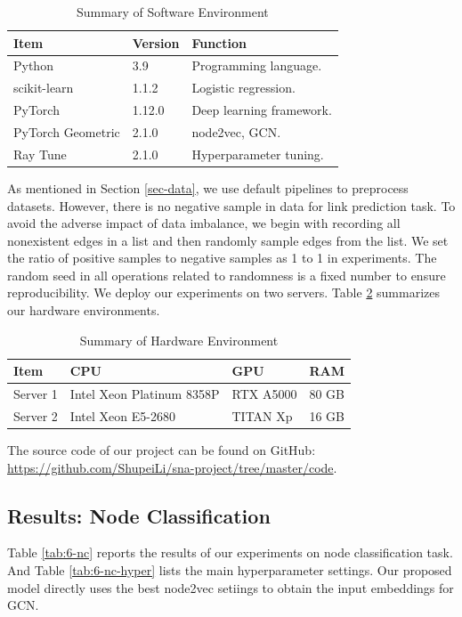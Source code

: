 \documentclass[sigconf]{acmart}
\begin{document}
\begin{table}[!ht]
    \centering
    \caption{Summary of Software Environment}
    \label{tab:6-software}
    \begin{tabular}{lll}
        \toprule
        \textbf{Item} & \textbf{Version} & \textbf{Function}\\
        \midrule
        Python & 3.9 & Programming language.\\
        scikit-learn & 1.1.2 & Logistic regression.\\
        PyTorch & 1.12.0 & Deep learning framework.\\
        PyTorch Geometric & 2.1.0 & node2vec, GCN.\\
        Ray Tune & 2.1.0 & Hyperparameter tuning.\\
        \bottomrule
    \end{tabular}
\end{table}

As mentioned in Section \ref{sec-data}, we use default pipelines to preprocess datasets. However, there is no negative sample in data for link prediction task. To avoid the adverse impact of data imbalance, we begin with recording all nonexistent edges in a list and then randomly sample edges from the list. We set the ratio of positive samples to negative samples as 1 to 1 in experiments. The random seed in all operations related to randomness is a fixed number to ensure reproducibility. We deploy our experiments on two servers. Table \ref{tab:6-hardware} summarizes our hardware environments.

\begin{table}[!ht]
    \centering
    \caption{Summary of Hardware Environment}
    \label{tab:6-hardware}
    \begin{tabular}{llll}
        \toprule
        \textbf{Item} & \textbf{CPU} & \textbf{GPU} & \textbf{RAM}\\
        \midrule
        Server 1 & Intel Xeon Platinum 8358P & RTX A5000 & 80 GB\\
        Server 2 & Intel Xeon E5-2680 & TITAN Xp & 16 GB\\
        \bottomrule
    \end{tabular}
\end{table}

The source code of our project can be found on GitHub: \url{https://github.com/ShupeiLi/sna-project/tree/master/code}.

\subsection{Results: Node Classification}
Table \ref{tab:6-nc} reports the results of our experiments on node classification task. And Table \ref{tab:6-nc-hyper} lists the main hyperparameter settings. Our proposed model directly uses the best node2vec setiings to obtain the input embeddings for GCN.
\end{document}
